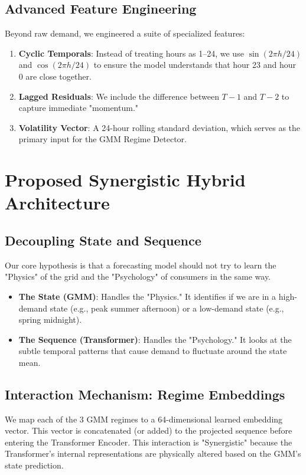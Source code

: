 \documentclass[conference]{IEEEtran}
\begin{document}
\subsection{Advanced Feature Engineering}
Beyond raw demand, we engineered a suite of specialized features:
\begin{enumerate}
    \item \textbf{Cyclic Temporals}: Instead of treating hours as 1--24, we use $\sin(2\pi h/24)$ and $\cos(2\pi h/24)$ to ensure the model understands that hour 23 and hour 0 are close together.
    \item \textbf{Lagged Residuals}: We include the difference between $T-1$ and $T-2$ to capture immediate "momentum."
    \item \textbf{Volatility Vector}: A 24-hour rolling standard deviation, which serves as the primary input for the GMM Regime Detector.
\end{enumerate}

\section{Proposed Synergistic Hybrid Architecture}
\subsection{Decoupling State and Sequence}
Our core hypothesis is that a forecasting model should not try to learn the "Physics" of the grid and the "Psychology" of consumers in the same way.
\begin{itemize}
    \item \textbf{The State (GMM)}: Handles the "Physics." It identifies if we are in a high-demand state (e.g., peak summer afternoon) or a low-demand state (e.g., spring midnight).
    \item \textbf{The Sequence (Transformer)}: Handles the "Psychology." It looks at the subtle temporal patterns that cause demand to fluctuate around the state mean.
\end{itemize}

\subsection{Interaction Mechanism: Regime Embeddings}
We map each of the 3 GMM regimes to a 64-dimensional learned embedding vector. This vector is concatenated (or added) to the projected sequence before entering the Transformer Encoder. This interaction is "Synergistic" because the Transformer's internal representations are physically altered based on the GMM's state prediction.
\end{document}

